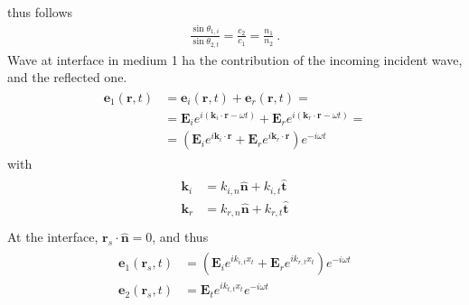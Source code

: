 \documentclass[letterpaper,10pt,italian]{jupyterBook}
\begin{document}
\sphinxAtStartPar
thus  follows
\begin{equation*}
\begin{split}\frac{\sin \theta_{1,i}}{\sin \theta_{2,t}} = \frac{c_2}{c_1} = \frac{n_1}{n_2} \ .\end{split}
\end{equation*}
\sphinxAtStartPar
{} Wave at interface in medium 1 ha the contribution of the incoming incident wave, and the reflected one.
\begin{equation*}
\begin{split}\begin{aligned}
\mathbf{e}_1(\mathbf{r},t) 
& = \mathbf{e}_i(\mathbf{r},t) + \mathbf{e}_r(\mathbf{r},t) = \\
& = \mathbf{E}_{i} e^{i \left( \mathbf{k}_i \cdot \mathbf{r} - \omega t \right)} + \mathbf{E}_{r} e^{i \left( \mathbf{k}_r \cdot \mathbf{r} - \omega t \right)} = \\
& = \left( \mathbf{E}_{i} e^{i \mathbf{k}_i \cdot \mathbf{r}} + \mathbf{E}_{r} e^{i \mathbf{k}_r \cdot \mathbf{r} } \right) e^{-i \omega t} 
\end{aligned}\end{split}
\end{equation*}
\sphinxAtStartPar
with
\begin{equation*}
\begin{split}\begin{aligned}
  \mathbf{k}_i & = k_{i,n} \hat{\mathbf{n}} + k_{i,t} \hat{\mathbf{t}} \\
  \mathbf{k}_r & = k_{r,n} \hat{\mathbf{n}} + k_{r,t} \hat{\mathbf{t}} \\
\end{aligned}\end{split}
\end{equation*}
\sphinxAtStartPar
At the interface, \(\mathbf{r}_s \cdot \hat{\mathbf{n}} = 0\), and thus
\begin{equation*}
\begin{split}\begin{aligned}
  \mathbf{e}_1(\mathbf{r}_s, t) & = \left( \mathbf{E}_i e^{i k_{i,t} x_t} + \mathbf{E}_r e^{i k_{r,t} x_t} \right) e^{-i\omega t} \\
  \mathbf{e}_2(\mathbf{r}_s, t) & =        \mathbf{E}_t e^{i k_{t,t} x_t} e^{-i \omega t} \\
\end{aligned}\end{split}
\end{equation*}
\end{document}
